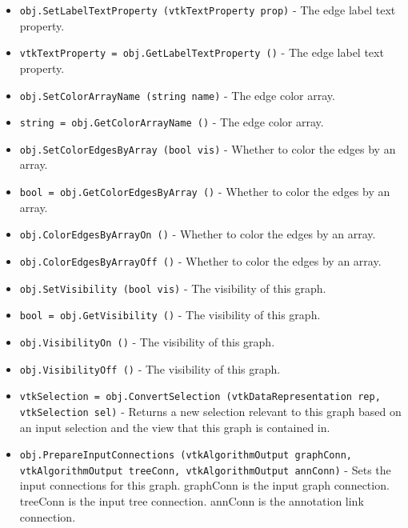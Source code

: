\begin{itemize}
\item  \verb|obj.SetLabelTextProperty (vtkTextProperty prop)| -  The edge label text property.

\item  \verb|vtkTextProperty = obj.GetLabelTextProperty ()| -  The edge label text property.

\item  \verb|obj.SetColorArrayName (string name)| -  The edge color array.

\item  \verb|string = obj.GetColorArrayName ()| -  The edge color array.

\item  \verb|obj.SetColorEdgesByArray (bool vis)| -  Whether to color the edges by an array.

\item  \verb|bool = obj.GetColorEdgesByArray ()| -  Whether to color the edges by an array.

\item  \verb|obj.ColorEdgesByArrayOn ()| -  Whether to color the edges by an array.

\item  \verb|obj.ColorEdgesByArrayOff ()| -  Whether to color the edges by an array.

\item  \verb|obj.SetVisibility (bool vis)| -  The visibility of this graph.

\item  \verb|bool = obj.GetVisibility ()| -  The visibility of this graph.

\item  \verb|obj.VisibilityOn ()| -  The visibility of this graph.

\item  \verb|obj.VisibilityOff ()| -  The visibility of this graph.

\item  \verb|vtkSelection = obj.ConvertSelection (vtkDataRepresentation rep, vtkSelection sel)| -  Returns a new selection relevant to this graph based on an input
 selection and the view that this graph is contained in.

\item  \verb|obj.PrepareInputConnections (vtkAlgorithmOutput graphConn, vtkAlgorithmOutput treeConn, vtkAlgorithmOutput annConn)| -  Sets the input connections for this graph.
 graphConn is the input graph connection.
 treeConn is the input tree connection.
 annConn is the annotation link connection.


\end{itemize}
